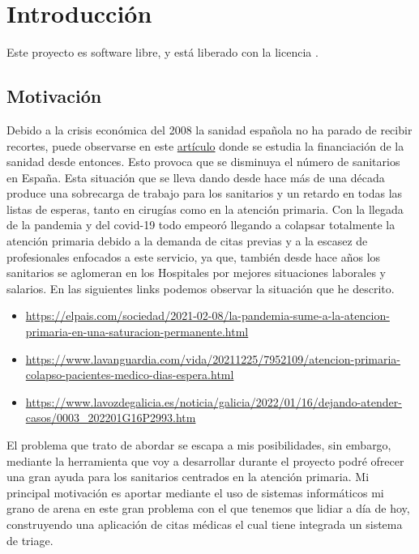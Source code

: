 \UseRawInputEncoding
\chapter{Introducción}

Este proyecto es software libre, y está liberado con la licencia \cite{gplv3}.

\section{Motivación}
Debido a la crisis económica del 2008 la sanidad española no ha parado de recibir recortes, puede observarse en este
\href{https://www.consalud.es/politica/decada-recortes-2009-2018-efectos-infrafinanciacion-sanidad_87083_102.html}{artículo} donde
se estudia la financiación de la sanidad desde entonces. Esto provoca que se disminuya el número de sanitarios en España.
Esta situación que se lleva dando desde hace más de una década produce una sobrecarga de trabajo para los sanitarios y un retardo
en todas las listas de esperas, tanto en cirugías como en la atención primaria.
Con la llegada de la pandemia y del covid-19 todo empeoró llegando a colapsar totalmente la atención primaria debido a la demanda
de citas previas y a la escasez de profesionales enfocados a este servicio, ya que, también desde hace años los sanitarios se aglomeran
en los Hospitales por mejores situaciones laborales y salarios. En las siguientes links podemos observar la situación que he descrito.
\begin{itemize}
    \item \url{https://elpais.com/sociedad/2021-02-08/la-pandemia-sume-a-la-atencion-primaria-en-una-saturacion-permanente.html}
    \item \url{https://www.lavanguardia.com/vida/20211225/7952109/atencion-primaria-colapso-pacientes-medico-dias-espera.html}
    \item \url{https://www.lavozdegalicia.es/noticia/galicia/2022/01/16/dejando-atender-casos/0003_202201G16P2993.htm}
\end{itemize}
El problema que trato de abordar se escapa a mis posibilidades, sin embargo, mediante la herramienta que voy a desarrollar
durante el proyecto podré ofrecer una gran ayuda para los sanitarios centrados en la atención primaria.
Mi principal motivación es aportar mediante el uso de sistemas informáticos mi grano de arena en este gran problema con el que
tenemos que lidiar a día de hoy, construyendo una aplicación de citas médicas el cual tiene integrada un sistema de triage.

